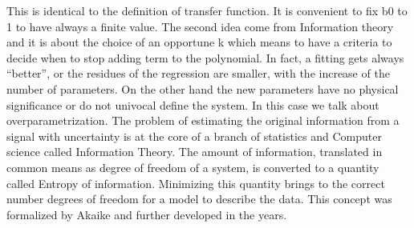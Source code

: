 This is identical to the definition of transfer function. It is convenient to fix b0 to 1 to have always a finite value. The second idea come from Information theory and it is about the choice of an opportune k which means to have a criteria to decide when to stop adding term to the polynomial. In fact, a fitting gets always “better”, or the residues of the regression are smaller, with the increase of the number of parameters. On the other hand the new parameters have no physical significance or do not univocal define the system. In this case we talk about overparametrization. The problem of estimating the original information from a signal with uncertainty is at the core of a branch of statistics and Computer science called Information Theory. The amount of information, translated in common means as degree of freedom of a system, is converted to a quantity called Entropy of information. Minimizing this quantity brings to the correct number degrees of freedom for a model to describe the data. This concept was formalized by Akaike and further developed in the years. 

